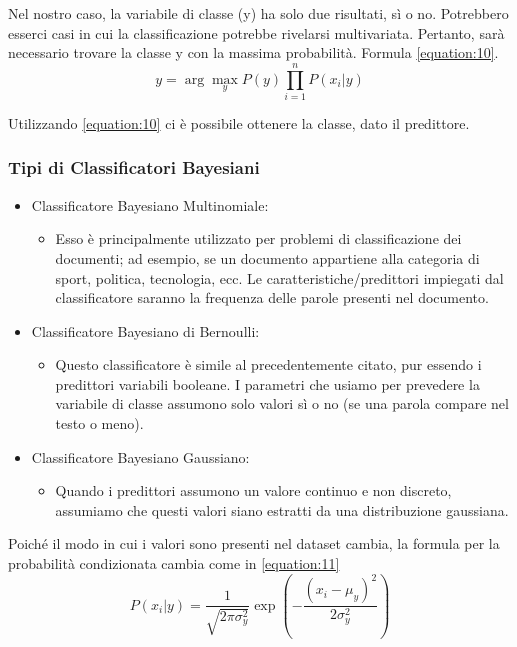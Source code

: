 Nel nostro caso, la variabile di classe (y) ha solo due risultati, sì o no. Potrebbero esserci casi in cui la classificazione potrebbe rivelarsi multivariata. Pertanto, sarà necessario trovare la classe y con la massima probabilità. Formula \ref{equation:10}.
\begin{equation}
    y = \arg\max_y P(y) \prod_{i=1}^{n} P(x_i|y)
    \label{equation:10}
\end{equation}

Utilizzando \ref{equation:10} ci è possibile ottenere la classe, dato il predittore.

\subsubsection{Tipi di Classificatori Bayesiani}
\begin{itemize}
\item Classificatore Bayesiano Multinomiale:
\begin{itemize}
\item Esso è principalmente utilizzato per problemi di classificazione dei documenti; ad esempio, se un documento appartiene alla categoria di sport, politica, tecnologia, ecc. Le caratteristiche/predittori impiegati dal classificatore saranno la frequenza delle parole presenti nel documento.
\end{itemize}
\item Classificatore Bayesiano di Bernoulli:
\begin{itemize}
\item Questo classificatore è simile al precedentemente citato, pur essendo i predittori variabili booleane. I parametri che usiamo per prevedere la variabile di classe assumono solo valori sì o no (se una parola compare nel testo o meno).
\end{itemize}
\item Classificatore Bayesiano Gaussiano:
\begin{itemize}
\item Quando i predittori assumono un valore continuo e non discreto, assumiamo che questi valori siano estratti da una distribuzione gaussiana.
\end{itemize}
\end{itemize}
Poiché il modo in cui i valori sono presenti nel dataset cambia, la formula per la probabilità condizionata cambia come in \ref{equation:11}
\begin{equation}
    P(x_i|y) = \frac{1}{\sqrt{2\pi\sigma_y^2}} \exp\left(-\frac{(x_i-\mu_y)^2}{2\sigma_y^2}\right)
    \label{equation:11}
\end{equation}

